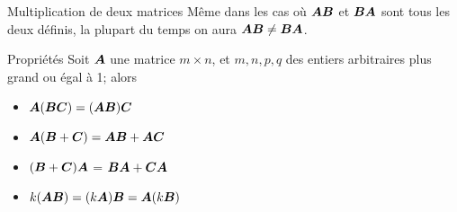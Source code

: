 \documentclass[french]{beamer}
\begin{document}
\begin{frame}{Multiplication de deux matrices}
Même dans les cas où $\boldsymbol{A}\boldsymbol{B}$ et $\boldsymbol{B}\boldsymbol{A}$ sont tous les deux définis, la plupart du temps on aura
$\boldsymbol{A}\boldsymbol{B} \neq \boldsymbol{B}\boldsymbol{A}$.
\end{frame}

\begin{frame}{Propriétés}
Soit $\boldsymbol{A}$ une matrice $m \times n$, et $m, n, p, q$ des entiers arbitraires plus grand ou égal à 1; alors
\begin{itemize}
\item $\boldsymbol{A}(\boldsymbol{B}\boldsymbol{C}) = (\boldsymbol{A}\boldsymbol{B})\boldsymbol{C}$ 
\item $\boldsymbol{A}(\boldsymbol{B}+\boldsymbol{C}) = \boldsymbol{A}\boldsymbol{B} + \boldsymbol{A}\boldsymbol{C}$ 
\item $(\boldsymbol{B}+\boldsymbol{C})\boldsymbol{A}$ = $\boldsymbol{B}\boldsymbol{A} + \boldsymbol{C}\boldsymbol{A}$ 
\item $k(\boldsymbol{A}\boldsymbol{B}) = (k\boldsymbol{A})\boldsymbol{B} = \boldsymbol{A}(k\boldsymbol{B})$ 
\end{itemize}

\end{frame}
\end{document}
